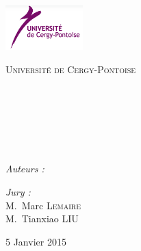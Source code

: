 
\begin{titlepage}

\begin{center}

\begin{minipage}[t]{0.48\textwidth}
  \begin{flushleft}
    \includegraphics [width=30mm]{images/logo.png} \\[0.5cm]
    \begin{spacing}{1.5}
      \textsc{\LARGE Université de Cergy-Pontoise}
    \end{spacing}
  \end{flushleft}
\end{minipage}
\begin{minipage}[t]{0.48\textwidth}
  \begin{flushright}
  \end{flushright}
\end{minipage} \\[1.5cm]

\textsc{\Large \reportsubject}\\[0.5cm]
\HRule \\[0.4cm]
{\huge \bfseries \reporttitle}\\[0.4cm]
\HRule \\[1.5cm]

\begin{minipage}[t]{0.3\textwidth}
  \begin{flushleft} \large
    \emph{Auteurs :}\\
    \reportauthor
  \end{flushleft}
\end{minipage}
\begin{minipage}[t]{0.6\textwidth}
  \begin{flushright} \large
    \emph{Jury :} \\
    M.~Marc \textsc{Lemaire} \\
    M.~Tianxiao \textsc{LIU}
  \end{flushright}
\end{minipage}

\vfill

{\large 5 Janvier 2015}

\end{center}

\end{titlepage}
